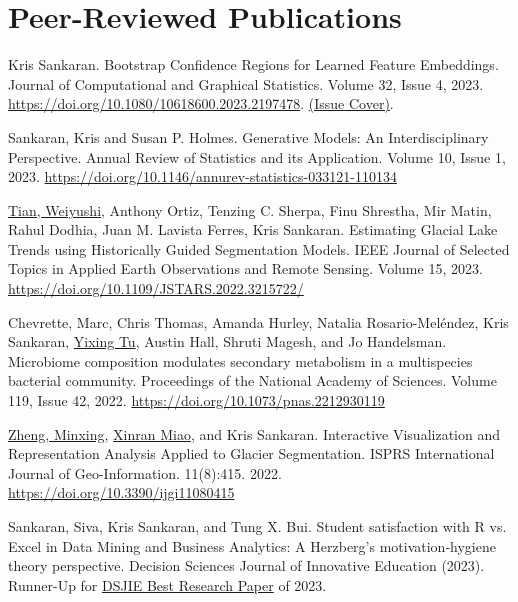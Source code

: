 \documentclass[letterpaper]{article}
\renewenvironment{itemize}{
  \begin{list}{}{
    \setlength{\leftmargin}{1.5em}
  }
}{
  \end{list}
}
\begin{document}
\section*{Peer-Reviewed Publications}
\begin{itemize}
\item Kris Sankaran. Bootstrap Confidence Regions for Learned Feature
Embeddings. Journal of Computational and Graphical Statistics. Volume 32, Issue 4, 2023.
\href{https://doi.org/10.1080/10618600.2023.2197478}{https://doi.org/10.1080/10618600.2023.2197478}.
\href{https://www.tandfonline.com/toc/ucgs20/current}{(Issue Cover)}.
\item Sankaran, Kris and Susan P. Holmes. Generative Models: An
Interdisciplinary Perspective. Annual Review of Statistics and its
Application. Volume 10, Issue 1, 2023. \href{https://doi.org/10.1146/annurev-statistics-033121-110134}{https://doi.org/10.1146/annurev-statistics-033121-110134}
\item \underline{Tian, Weiyushi}, Anthony Ortiz, Tenzing C. Sherpa, Finu Shrestha, Mir
Matin, Rahul Dodhia, Juan M. Lavista Ferres, Kris Sankaran. Estimating
Glacial Lake Trends using Historically Guided Segmentation Models. IEEE Journal
of Selected Topics in Applied Earth Observations and Remote Sensing. Volume 15,
2023. \href{https://doi.org/10.1109/JSTARS.2022.3215722/}{https://doi.org/10.1109/JSTARS.2022.3215722/}
\item Chevrette, Marc, Chris Thomas, Amanda Hurley, Natalia Rosario-Mel{\'e}ndez,
Kris Sankaran, \underline{Yixing Tu}, Austin Hall, Shruti Magesh,
and Jo Handelsman. Microbiome composition modulates secondary metabolism in a
multispecies bacterial community. Proceedings of the National Academy of
Sciences. Volume 119, Issue 42, 2022. \href{https://doi.org/10.1073/pnas.2212930119}{https://doi.org/10.1073/pnas.2212930119}
\item \underline{Zheng, Minxing}, \underline{Xinran Miao}, and Kris Sankaran.
Interactive Visualization and Representation Analysis Applied to Glacier
Segmentation. ISPRS International Journal of Geo-Information. 11(8):415. 2022.
\href{https://doi.org/10.3390/ijgi11080415}{https://doi.org/10.3390/ijgi11080415}
\item Sankaran, Siva, Kris Sankaran, and Tung X. Bui. Student satisfaction with R vs. Excel in Data
Mining and Business Analytics: A Herzberg's motivation‐hygiene theory
perspective. Decision Sciences Journal of Innovative Education (2023). Runner-Up for \href{https://onlinelibrary.wiley.com/pb-assets/assets/15404609/DSJIE-2023-Awards-1700644906877.pdf}{DSJIE Best Research Paper} of 2023.

\end{itemize}
\end{document}
